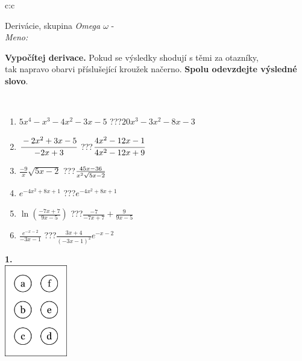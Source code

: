 \documentclass[10pt]{report}
\begin{document}
\begin{tabular}{c:c}
\begin{minipage}[c][104.5mm][t]{0.5\linewidth}
\begin{center}
\vspace{7mm}
{\huge Derivácie, skupina \textit{Omega $\omega$} -}\\[5mm]
\textit{Meno:}\phantom{xxxxxxxxxxxxxxxxxxxxxxxxxxxxxxxxxxxxxxxxxxxxxxxxxxxxxxxxxxxxxxxxx}\\[5mm]
\begin{minipage}{0.95\linewidth}
\begin{center}
\textbf{Vypočítej derivace.} Pokud se výsledky shodují s těmi za otazníky,\\tak napravo obarvi příslušející kroužek načerno. \textbf{Spolu odevzdejte výsledné slovo}.
\end{center}
\end{minipage}
\\[1mm]
\begin{minipage}{0.79\linewidth}
\begin{center}
\begin{varwidth}{\linewidth}
\begin{enumerate}
\normalsize
\item $5x^4-x^3-4x^2-3x-5$\quad \dotfill\; ???\;\dotfill \quad $20x^3-3x^2-8x-3$
\item $\cfrac{-2x^2+3x-5}{-2x+3}$\quad \dotfill\; ???\;\dotfill \quad $\cfrac{4x^2-12x-1}{4x^2-12x+9}$
\item $\frac{-9}{x}\sqrt{5x-2}$\quad \dotfill\; ???\;\dotfill \quad $\frac{45x-36}{x^2 \sqrt{\smash[b]{5x-2}}}$
\item $e^{-4x^2+8x+1}$\quad \dotfill\; ???\;\dotfill \quad $e^{-4x^2+8x+1}$
\item $\ln{\left(\frac{-7x+7}{9x-5}\right)}$\quad \dotfill\; ???\;\dotfill \quad $\frac{-7}{-7x+7}+\frac{9}{9x-5}$
\item $\frac{e^{-x-2}}{-3x-1}$\quad \dotfill\; ???\;\dotfill \quad $\frac{3x+4}{(-3x-1)^2}e^{-x-2}$
\end{enumerate}
\end{varwidth}
\end{center}
\end{minipage}
\begin{minipage}{0.20\linewidth}
\begin{center}
{\Huge\bfseries 1.} \\[2mm]
\includegraphics[height=40mm]{../images/braille.png}

\end{center}
\end{minipage}
\end{center}
\end{minipage}
\end{tabular}
\end{document}
